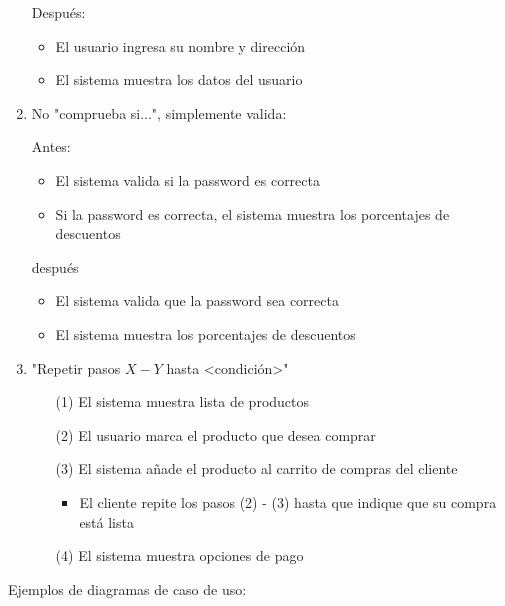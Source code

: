 \begin{enumerate}
        Después:
        
        \begin{itemize}
            \item El usuario ingresa su nombre y dirección
            \item El sistema muestra los datos del usuario
        \end{itemize}
        
        \item No "comprueba si...", simplemente valida:
        
        Antes:
        \begin{itemize}
            \item El sistema valida si la password es correcta
            \item Si la password es correcta, el sistema muestra los porcentajes de descuentos
        \end{itemize}
        
        después
        \begin{itemize}
            \item El sistema valida que la password sea correcta
            \item El sistema muestra los porcentajes de descuentos
        \end{itemize}
        
        \item "Repetir pasos $X-Y$ hasta <condición>"
        
        \begin{enumerate}
            \item[(1)] El sistema muestra lista de productos
            \item[(2)] El usuario marca el producto que desea comprar
            \item[(3)] El sistema añade el producto al carrito de compras del cliente
            
            \begin{itemize}
                \item El cliente repite los pasos (2) - (3) hasta que indique que su compra está lista
            \end{itemize}
            
            \item[(4)] El sistema muestra opciones de pago
            
        \end{enumerate}
        
    \end{enumerate}
    \newpage 
    Ejemplos de diagramas de caso de uso:
    
